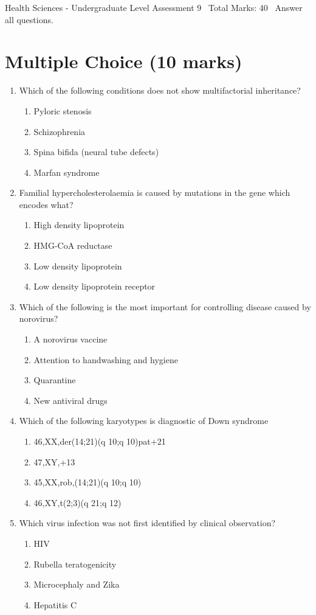 \documentclass[12pt]{article}
\begin{document}
\begin{center}
Health Sciences - Undergraduate Level Assessment 9 \
Total Marks: 40 \
Answer all questions.
\end{center}

\section*{Multiple Choice (10 marks)}
\begin{enumerate}[label=\arabic*.]
\item Which of the following conditions does not show multifactorial inheritance?
\begin{enumerate}[label=(\alph*)]
    \item Pyloric stenosis
    \item Schizophrenia
    \item Spina bifida (neural tube defects)
    \item Marfan syndrome
\end{enumerate}
\item Familial hypercholesterolaemia is caused by mutations in the gene which encodes what?
\begin{enumerate}[label=(\alph*)]
    \item High density lipoprotein
    \item HMG-CoA reductase
    \item Low density lipoprotein
    \item Low density lipoprotein receptor
\end{enumerate}
\item Which of the following is the most important for controlling disease caused by norovirus?
\begin{enumerate}[label=(\alph*)]
    \item A norovirus vaccine
    \item Attention to handwashing and hygiene
    \item Quarantine
    \item New antiviral drugs
\end{enumerate}
\item Which of the following karyotypes is diagnostic of Down syndrome
\begin{enumerate}[label=(\alph*)]
    \item 46,XX,der(14;21)(q 10;q 10)pat+21
    \item 47,XY,+13
    \item 45,XX,rob,(14;21)(q 10;q 10)
    \item 46,XY,t(2;3)(q 21;q 12)
\end{enumerate}
\item Which virus infection was not first identified by clinical observation?
\begin{enumerate}[label=(\alph*)]
    \item HIV
    \item Rubella teratogenicity
    \item Microcephaly and Zika
    \item Hepatitis C
\end{enumerate}
\end{enumerate}
\end{document}
